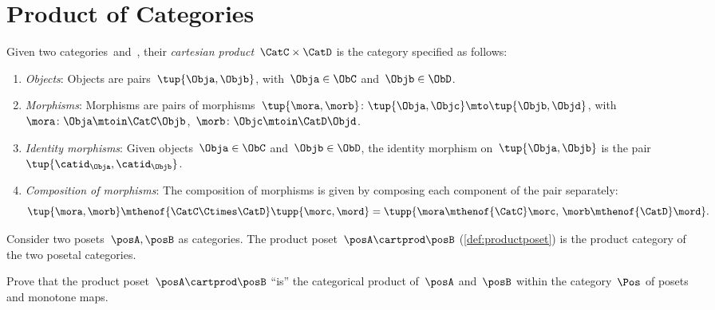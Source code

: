
\section{Product of Categories}

\begin{ctdefinition}
    \label{def:cartesian-product-category}
    Given two categories~\CatC and~\CatD, their \emph{cartesian product}~$\CatC \times \CatD$ is the category specified as follows:
    \begin{enumerate}
        \item \emph{Objects}: Objects are pairs~$\tup{\Obja,\Objb}$, with~$\Obja\in \ObC$ and~$\Objb\in \ObD$.
        \item \emph{Morphisms}: Morphisms are pairs of morphisms~$\tup{\mora,\morb} \colon \tup{\Obja,\Objc}\mto \tup{\Objb,\Objd}$, with~$\mora\colon \Obja \mtoin\CatC \Objb$,~$\morb\colon \Objc\mtoin\CatD \Objd$.
        \item \emph{Identity morphisms}: Given objects~$\Obja\in \ObC$ and~$\Objb\in \ObD$, the identity morphism on~$\tup{\Obja,\Objb}$ is the pair $\tup{\catid_\Obja ,\catid_\Objb}$.
        \item \emph{Composition of morphisms}: The composition of morphisms is given by composing each component of the pair separately:
              \begin{equation}
                  \tup{\mora,\morb}\mthenof{\CatC\Ctimes\CatD} \tupp{\morc,\mord}=\tupp{\mora\mthenof{\CatC}\morc,\, \morb \mthenof{\CatD} \mord}.
              \end{equation}
    \end{enumerate}
\end{ctdefinition}

\begin{example}
    Consider two posets~$\posA,\posB$ as categories.
    The product poset~$\posA\cartprod \posB$ (\cref{def:productposet}) is the product category of the two posetal categories.
\end{example}

\begin{gradedexercise}
    Prove that the product poset~$\posA \cartprod \posB$ ``is'' the categorical product of~$\posA$ and~$\posB$ within the category~$\Pos$ of posets and monotone maps.
\end{gradedexercise}

